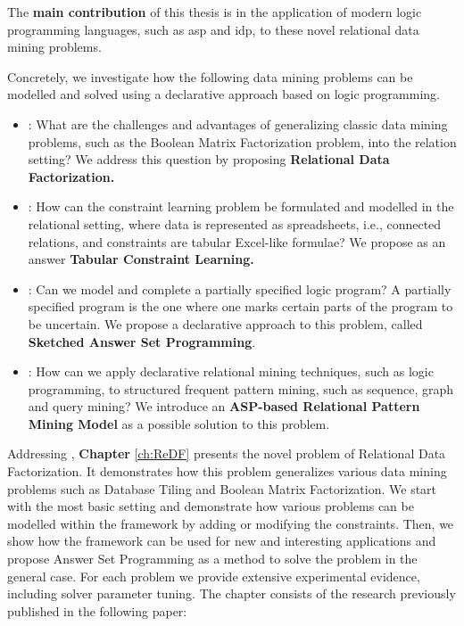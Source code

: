 The \textbf{main contribution} of this thesis is in the application of
modern logic programming languages, such as \acrshort{asp} and
\acrshort{idp}, to these novel relational data mining problems.


Concretely, we investigate how the following data mining problems
can be modelled and solved using a declarative approach based on
logic programming.
\pubrev
\begin{itemize}
    \item \cone: What are the challenges and advantages of generalizing
    classic data mining problems, such as the Boolean Matrix
    Factorization problem, into the relation setting? We address this
        question by proposing \textbf{Relational Data Factorization.}
  \item \ctwo: How can the constraint learning problem be formulated
   and modelled in the relational setting, where data is
   represented as spreadsheets, i.e., connected relations, and constraints are
   tabular Excel-like formulae? We propose as an answer \textbf{Tabular Constraint Learning.} 
  \item \cthree: Can we model and complete a partially specified logic program?
      A partially specified program is the one where one marks certain parts of the
        program to be uncertain. We propose a declarative approach to
        this problem, called \textbf{Sketched Answer Set Programming}.
   \item \cfour:
    How can we apply declarative relational mining
    techniques, such as logic programming, to structured frequent pattern mining, such as sequence, graph
    and query mining? We introduce an \textbf{ASP-based Relational
        Pattern Mining Model} as a possible solution to this problem.
\end{itemize}
\pubrevend

Addressing \cone, \textbf{Chapter} \ref{ch:ReDF} presents the novel problem of Relational Data
Factorization. It demonstrates how this problem generalizes various
data mining problems such as Database Tiling and Boolean Matrix
Factorization. We start with the most basic setting and demonstrate
how various problems can be modelled within the framework by adding
or modifying the constraints. Then, we show how the framework can be
used for new and interesting applications and propose Answer Set
Programming as a method to solve the problem in the general case.
For each problem we provide extensive experimental evidence,
including solver parameter tuning. The chapter consists of the
research previously published in the following paper:


